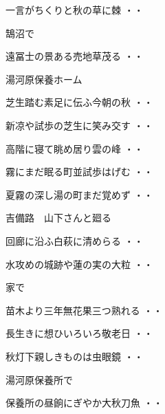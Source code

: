 \vspace{0.4cm}
\begin{shiika}一言がちくりと秋の草に棘
\hfill{・・}\end{shiika}
\vspace{0.4cm}
鵠沼で
\begin{shiika}遠冨士の景ある売地草茂る
\hfill{・・}\end{shiika}
\vspace{0.4cm}
湯河原保養ホーム
\begin{shiika}芝生踏む素足に伝ふ今朝の秋
\hfill{・・}\end{shiika}
\begin{shiika}新凉や試歩の芝生に笑み交す
\hfill{・・}\end{shiika}
\begin{shiika}高階に寝て眺め居り雲の峰
\hfill{・・}\end{shiika}
\begin{shiika}霧にまだ眠る町並試歩はげむ
\hfill{・・}\end{shiika}
\begin{shiika}夏霧の深し湯の町まだ覚めず
\hfill{・・}\end{shiika}
\vspace{0.4cm}
吉備路　山下さんと廻る
\begin{shiika}回廊に沿ふ白萩に清めらる
\hfill{・・}\end{shiika}
\begin{shiika}水攻めの城跡や蓮の実の大粒
\hfill{・・}\end{shiika}
\vspace{0.4cm}
家で
\begin{shiika}苗木より三年無花果三つ熟れる
\hfill{・・}\end{shiika}
\begin{shiika}長生きに想ひいろいろ敬老日
\hfill{・・}\end{shiika}
\begin{shiika}秋灯下親しきものは虫眼鏡
\hfill{・・}\end{shiika}
\vspace{0.4cm}
湯河原保養所で
\begin{shiika}保養所の昼餉にぎやか大秋刀魚
\hfill{・・}\end{shiika}
